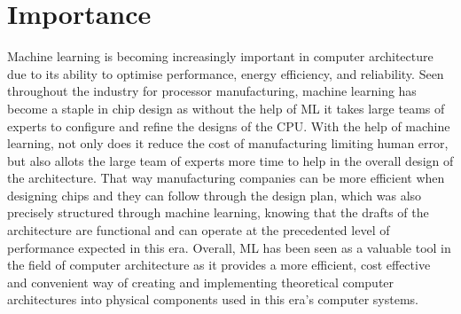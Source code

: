 \documentclass[conference]{IEEEtran}
\begin{document}
\section{Importance}
Machine learning is becoming increasingly important in computer architecture due to its ability to optimise performance, energy efficiency, and reliability. 
Seen throughout the industry for processor manufacturing, machine learning has become a staple in chip design as without the help of ML it takes large teams of 
experts to configure and refine the designs of the CPU. With the help of machine learning, not only does it reduce the cost of manufacturing limiting
human error, but also allots the large team of experts more time to help in the overall design of the architecture. That way manufacturing companies can 
be more efficient when designing chips and they can follow through the design plan, which was also precisely structured through machine learning, knowing that 
the drafts of the architecture are functional and can operate at the precedented level of performance expected in this era. Overall, ML has been seen as a valuable 
tool in the field of computer architecture as it provides a more efficient, cost effective and convenient way of creating and implementing theoretical computer 
architectures into physical components used in this era's computer systems.
\end{document}
